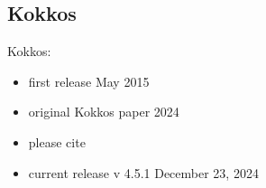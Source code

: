 \subsection{Kokkos}

Kokkos:
\begin{itemize}
    \item first release May 2015~\cite{trott_kokkos_2015}
    \item original Kokkos paper 2024~\cite{carter_edwards_kokkos_2014}
    \item please cite~\cite{trott_kokkos_2022}
    \item current release v 4.5.1 December 23, 2024~\cite{noauthor_release_2024}
\end{itemize}